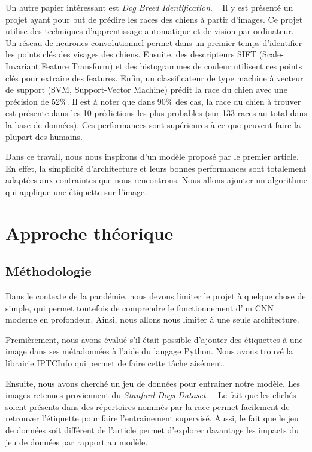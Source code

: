 \documentclass{article}
\begin{document}
Un autre papier intéressant est \textit{Dog Breed Identification}. 
~\cite{output} Il y est présenté un projet ayant pour but de prédire les races
des chiens à partir d’images. Ce projet utilise des techniques d’apprentissage
automatique et de vision par ordinateur. Un réseau de neurones convolutionnel
permet dans un premier temps d’identifier les points clés des visages des 
chiens. Ensuite, des descripteurs SIFT (Scale-Invariant Feature Transform) et 
des histogrammes de couleur utilisent ces points clés pour extraire des 
features. Enfin, un classificateur de type machine à vecteur de support (SVM,
Support-Vector Machine) prédit la race du chien avec une précision de 52\%. Il
est à noter que dans 90\% des cas, la race du chien à trouver est présente dans
les 10 prédictions les plus probables (sur 133 races au total dans la base de 
données). Ces performances sont supérieures à ce que peuvent faire la plupart
des humains.

Dans ce travail, nous nous inspirons d'un modèle proposé par le premier article.
En effet, la simplicité d’architecture et leurs bonnes performances sont
 totalement adaptées aux contraintes que nous rencontrons. Nous allons ajouter
un algorithme qui applique une étiquette sur l'image.

\section{Approche théorique}

\subsection{Méthodologie}
Dans le contexte de la pandémie, nous devons limiter le projet à quelque chose 
de simple, qui permet toutefois de comprendre le fonctionnement d'un CNN 
moderne en profondeur. Ainsi, nous allons nous limiter à une seule architecture.

Premièrement, nous avons évalué s'il était possible d'ajouter des étiquettes à une
image dans ses métadonnées à l'aide du langage Python. Nous avons trouvé la
librairie IPTCInfo qui permet de faire cette tâche aisément.

Ensuite, nous avons cherché un jeu de données pour entrainer notre modèle. Les
images retenues proviennent du \textit{Stanford Dogs Dataset}. 
~\cite{KhoslaYaoJayadevaprakashFeiFei_FGVC2011} Le fait que les clichés soient
présents dans des répertoires nommés par la race permet facilement de retrouver
l'étiquette pour faire l'entrainement supervisé. Aussi, le fait que le jeu de
données soit différent de l'article permet d'explorer davantage les impacts du
jeu de données  par rapport au modèle.
\end{document}

